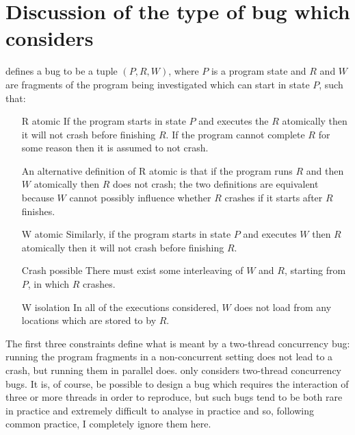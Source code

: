 \label{chapter:derive_manip}
\section{Discussion of the type of bug which {\technique} considers}
\label{sect:finding_bugs:finding_candidate_bugs:formal_definition}


{\Technique} defines a bug to be a tuple $(P, R, W)$, where $P$ is a
program state and $R$ and $W$ are fragments of the program being
investigated which can start in state $P$, such that:

\begin{itemize}
\item[R atomic] If the program starts in state $P$ and executes the
  $R$ atomically then it will not crash before finishing $R$.  If the
  program cannot complete $R$ for some reason then it is assumed to
  not crash.

  An alternative definition of R atomic is that if the program runs
  $R$ and then $W$ atomically then $R$ does not crash; the two
  definitions are equivalent because $W$ cannot possibly influence
  whether $R$ crashes if it starts after $R$ finishes.

\item[W atomic] Similarly, if the program starts in state $P$ and
  executes $W$ then $R$ atomically then it will not crash before
  finishing $R$.
\item[Crash possible] There must exist some interleaving of $W$ and
  $R$, starting from $P$, in which $R$ crashes.
\item[W isolation] In all of the executions considered, $W$ does not
  load from any locations which are stored to by $R$.
\end{itemize}

The first three constraints define what is meant by a two-thread
concurrency bug: running the program fragments in a non-concurrent
setting does not lead to a crash, but running them in parallel does.
{\Technique} only considers two-thread concurrency bugs.  It is, of
course, be possible to design a bug which requires the interaction of
three or more threads in order to reproduce, but such bugs tend to be
both rare in practice and extremely difficult to analyse in
practice\needCite{} and so, following common practice\needCite{}, I
completely ignore them here.

